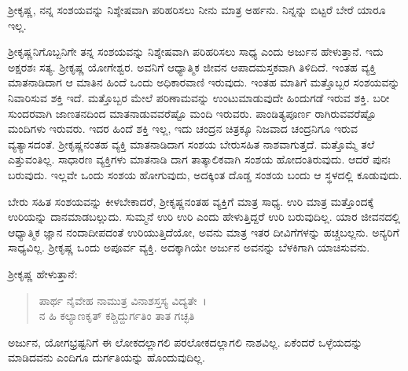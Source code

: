 {\small ಶ‍್ರೀಕೃಷ್ಣ, ನನ್ನ ಸಂಶಯವನ್ನು ನಿಶ್ಶೇಷವಾಗಿ ಪರಿಹರಿಸಲು ನೀನು ಮಾತ್ರ ಅರ್ಹನು. ನಿನ್ನನ್ನು ಬಿಟ್ಟರೆ ಬೇರೆ ಯಾರೂ ಇಲ್ಲ.}

ಶ‍್ರೀಕೃಷ್ಣನಿಗೊಬ್ಬನಿಗೇ ತನ್ನ ಸಂಶಯವನ್ನು ನಿಶ್ಶೇಷವಾಗಿ ಪರಿಹರಿಸಲು ಸಾಧ್ಯ ಎಂದು ಅರ್ಜುನ ಹೇಳುತ್ತಾನೆ. ಇದು ಅಕ್ಷರಶಃ ಸತ್ಯ. ಶ‍್ರೀಕೃಷ್ಣ ಯೋಗೇಶ್ವರ. ಅವನಿಗೆ ಆಧ್ಯಾತ್ಮಿಕ ಜೀವನ ಆಪಾದಮಸ್ತಕವಾಗಿ ತಿಳಿದಿದೆ. ಇಂತಹ ವ್ಯಕ್ತಿ ಮಾತನಾಡಿದಾಗ ಆ ಮಾತಿನ ಹಿಂದೆ ಒಂದು ಅಧಿಕಾರವಾಣಿ ಇರುವುದು. ಇಂತಹ ಮಾತಿಗೆ ಮತ್ತೊಬ್ಬರ ಸಂಶಯವನ್ನು ನಿವಾರಿಸುವ ಶಕ್ತಿ ಇದೆ. ಮತ್ತೊಬ್ಬರ ಮೇಲೆ ಪರಿಣಾಮವನ್ನು ಉಂಟುಮಾಡುವುದೇ ಹಿಂದುಗಡೆ ಇರುವ ಶಕ್ತಿ. ಬರೀ ಸುಂದರವಾಗಿ ಜಾಣತನದಿಂದ ಮಾತನಾಡುವವರೆಷ್ಟೊ ಮಂದಿ ಇರುವರು. ಪಾಂಡಿತ್ಯಪೂರ್ಣ ರಾಗಿರುವವರೆಷ್ಟೊ ಮಂದಿಗಳು ಇರುವರು. ಇದರ ಹಿಂದೆ ಶಕ್ತಿ ಇಲ್ಲ, ಇದು ಚಂದ್ರನ ಚಿತ್ರಕ್ಕೂ ನಿಜವಾದ ಚಂದ್ರನಿಗೂ ಇರುವ ವ್ಯತ್ಯಾಸದಂತೆ. ಶ‍್ರೀಕೃಷ್ಣನಂತಹ ವ್ಯಕ್ತಿ ಮಾತನಾಡಿದಾಗ ಸಂಶಯ ಬೇರುಸಹಿತ ನಾಶವಾಗುತ್ತದೆ. ಮತ್ತೊಮ್ಮೆ ತಲೆ ಎತ್ತುವಂತಿಲ್ಲ. ಸಾಧಾರಣ ವ್ಯಕ್ತಿಗಳು ಮಾತನಾಡಿ ದಾಗ ತಾತ್ಕಾಲಿಕವಾಗಿ ಸಂಶಯ ಹೋದಂತಿರುವುದು. ಆದರೆ ಪುನಃ ಬರುವುದು. ಇಲ್ಲವೇ ಒಂದು ಸಂಶಯ ಹೋಗುವುದು, ಅದಕ್ಕಿಂತ ದೊಡ್ಡ ಸಂಶಯ ಬಂದು ಆ ಸ್ಥಳದಲ್ಲಿ ಕೂಡುವುದು.

ಬೇರು ಸಹಿತ ಸಂಶಯವನ್ನು ಕೀಳಬೇಕಾದರೆ, ಶ‍್ರೀಕೃಷ್ಣನಂತಹ ವ್ಯಕ್ತಿಗೆ ಮಾತ್ರ ಸಾಧ್ಯ. ಉರಿ ಮಾತ್ರ ಮತ್ತೊಂದಕ್ಕೆ ಉರಿಯನ್ನು ದಾನಮಾಡಬಲ್ಲುದು. ಸುಮ್ಮನೆ ಉರಿ ಉರಿ ಎಂದು ಹೇಳುತ್ತಿದ್ದರೆ ಉರಿ ಬರುವುದಿಲ್ಲ. ಯಾರ ಜೀವನದಲ್ಲಿ ಆಧ್ಯಾತ್ಮಿಕ ಜ್ಞಾನ ನಂದಾದೀಪದಂತೆ ಉರಿಯುತ್ತಿದೆಯೋ, ಅವನು ಮಾತ್ರ ಇತರ ದೀವಿಗೆಗಳನ್ನು ಹಚ್ಚಬಲ್ಲನು. ಅನ್ಯರಿಗೆ ಸಾಧ್ಯವಿಲ್ಲ. ಶ‍್ರೀಕೃಷ್ಣ ಒಂದು ಅಪೂರ್ವ ವ್ಯಕ್ತಿ. ಅದಕ್ಕಾಗಿಯೇ ಅರ್ಜುನ ಅವನನ್ನು ಬೆಳಕಿಗಾಗಿ ಯಾಚಿಸುವನು.

ಶ‍್ರೀಕೃಷ್ಣ ಹೇಳುತ್ತಾನೆ:

\begin{verse}
ಪಾರ್ಥ ನೈವೇಹ ನಾಮುತ್ರ ವಿನಾಶಸ್ತಸ್ಯ ವಿದ್ಯತೇ~।\\ನ ಹಿ ಕಲ್ಯಾಣಕೃತ್ ಕಶ್ಚಿದ್ದುರ್ಗತಿಂ ತಾತ ಗಚ್ಛತಿ 
\end{verse}

{\small ಅರ್ಜುನ, ಯೋಗಭ್ರಷ್ಟನಿಗೆ ಈ ಲೋಕದಲ್ಲಾಗಲಿ ಪರಲೋಕದಲ್ಲಾಗಲಿ ನಾಶವಿಲ್ಲ. ಏಕೆಂದರೆ ಒಳ್ಳೆಯದನ್ನು ಮಾಡಿದವನು ಎಂದಿಗೂ ದುರ್ಗತಿಯನ್ನು ಹೊಂದುವುದಿಲ್ಲ.}

